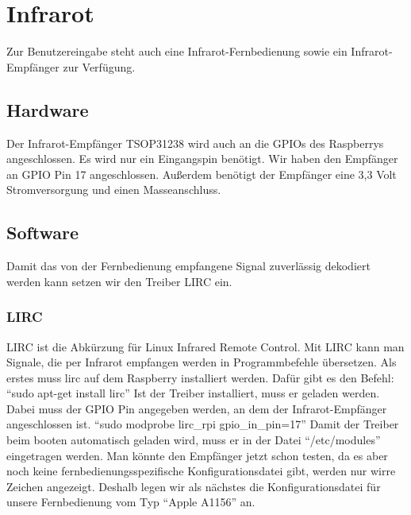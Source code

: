\section{Infrarot}
Zur Benutzereingabe steht auch eine Infrarot-Fernbedienung sowie ein Infrarot-Empfänger zur Verfügung. 

\subsection{Hardware}
Der Infrarot-Empfänger TSOP31238 wird auch an die GPIOs des Raspberrys angeschlossen. 
\newline
Es wird nur ein Eingangspin benötigt. Wir haben den Empfänger an GPIO Pin 17 angeschlossen. Außerdem benötigt der Empfänger eine 3,3 Volt Stromversorgung und einen Masseanschluss. 

\subsection{Software}
Damit das von der Fernbedienung empfangene Signal zuverlässig dekodiert werden kann setzen wir den Treiber LIRC ein.
\subsubsection{LIRC}
LIRC ist die Abkürzung für Linux Infrared Remote Control. Mit LIRC kann man Signale, die per Infrarot empfangen werden in Programmbefehle übersetzen.
\newline
Als erstes muss lirc auf dem Raspberry installiert werden. Dafür gibt es den Befehl:
\newline
"`sudo apt-get install lirc"'
\newline
Ist der Treiber installiert, muss er geladen werden. Dabei muss der GPIO Pin angegeben werden, an dem der Infrarot-Empfänger angeschlossen ist.
\newline
"`sudo modprobe lirc\_rpi gpio\_in\_pin=17"'
\newline
Damit der Treiber beim booten automatisch geladen wird, muss er in der Datei "`/etc/modules"' eingetragen werden.
\newline
\newline
Man könnte den Empfänger jetzt schon testen, da es aber noch keine fernbedienungsspezifische Konfigurationsdatei gibt, werden nur wirre Zeichen angezeigt.
Deshalb legen wir als nächstes die Konfigurationsdatei für unsere Fernbedienung vom Typ "`Apple A1156"' an.

